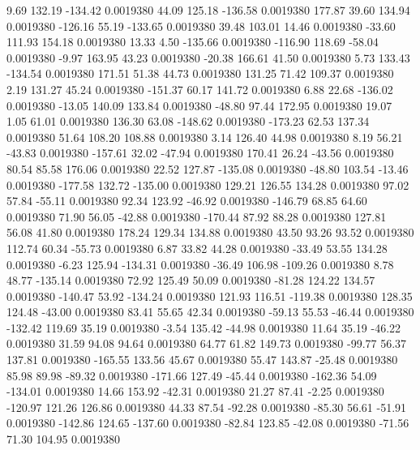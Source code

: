     9.69  132.19 -134.42   0.0019380
   44.09  125.18 -136.58   0.0019380
  177.87   39.60  134.94   0.0019380
 -126.16   55.19 -133.65   0.0019380
   39.48  103.01   14.46   0.0019380
  -33.60  111.93  154.18   0.0019380
   13.33    4.50 -135.66   0.0019380
 -116.90  118.69  -58.04   0.0019380
   -9.97  163.95   43.23   0.0019380
  -20.38  166.61   41.50   0.0019380
    5.73  133.43 -134.54   0.0019380
  171.51   51.38   44.73   0.0019380
  131.25   71.42  109.37   0.0019380
    2.19  131.27   45.24   0.0019380
 -151.37   60.17  141.72   0.0019380
    6.88   22.68 -136.02   0.0019380
  -13.05  140.09  133.84   0.0019380
  -48.80   97.44  172.95   0.0019380
   19.07    1.05   61.01   0.0019380
  136.30   63.08 -148.62   0.0019380
 -173.23   62.53  137.34   0.0019380
   51.64  108.20  108.88   0.0019380
    3.14  126.40   44.98   0.0019380
    8.19   56.21  -43.83   0.0019380
 -157.61   32.02  -47.94   0.0019380
  170.41   26.24  -43.56   0.0019380
   80.54   85.58  176.06   0.0019380
   22.52  127.87 -135.08   0.0019380
  -48.80  103.54  -13.46   0.0019380
 -177.58  132.72 -135.00   0.0019380
  129.21  126.55  134.28   0.0019380
   97.02   57.84  -55.11   0.0019380
   92.34  123.92  -46.92   0.0019380
 -146.79   68.85   64.60   0.0019380
   71.90   56.05  -42.88   0.0019380
 -170.44   87.92   88.28   0.0019380
  127.81   56.08   41.80   0.0019380
  178.24  129.34  134.88   0.0019380
   43.50   93.26   93.52   0.0019380
  112.74   60.34  -55.73   0.0019380
    6.87   33.82   44.28   0.0019380
  -33.49   53.55  134.28   0.0019380
   -6.23  125.94 -134.31   0.0019380
  -36.49  106.98 -109.26   0.0019380
    8.78   48.77 -135.14   0.0019380
   72.92  125.49   50.09   0.0019380
  -81.28  124.22  134.57   0.0019380
 -140.47   53.92 -134.24   0.0019380
  121.93  116.51 -119.38   0.0019380
  128.35  124.48  -43.00   0.0019380
   83.41   55.65   42.34   0.0019380
  -59.13   55.53  -46.44   0.0019380
 -132.42  119.69   35.19   0.0019380
   -3.54  135.42  -44.98   0.0019380
   11.64   35.19  -46.22   0.0019380
   31.59   94.08   94.64   0.0019380
   64.77   61.82  149.73   0.0019380
  -99.77   56.37  137.81   0.0019380
 -165.55  133.56   45.67   0.0019380
   55.47  143.87  -25.48   0.0019380
   85.98   89.98  -89.32   0.0019380
 -171.66  127.49  -45.44   0.0019380
 -162.36   54.09 -134.01   0.0019380
   14.66  153.92  -42.31   0.0019380
   21.27   87.41   -2.25   0.0019380
 -120.97  121.26  126.86   0.0019380
   44.33   87.54  -92.28   0.0019380
  -85.30   56.61  -51.91   0.0019380
 -142.86  124.65 -137.60   0.0019380
  -82.84  123.85  -42.08   0.0019380
  -71.56   71.30  104.95   0.0019380
